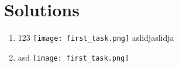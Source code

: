 \documentclass{article}
\begin{document}

\section*{Solutions}
\begin{enumerate}
        \item 123 \makebox[0pt][l]{}
        \texttt{[image: first\_task.png]}
 aslidjaslidja
        \item asd \makebox[0pt][l]{}
        \texttt{[image: first\_task.png]}
\end{enumerate}
\end{document}
